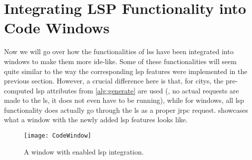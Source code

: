 \documentclass[../thesis]{subfiles}
\begin{document}
\section{Integrating LSP Functionality into Code Windows}\label{sec:intowindow}
Now we will go over how the functionalities of \glspl{ls} have been integrated into \glspl{window} to make them more \gls{ide}-like.
Some of these functionalities will seem quite similar to the way the corresponding  \gls{lsp} features were implemented in the previous section.
However, a crucial difference here is that, for \glspl{city}, the pre-computed \gls{lsp} attributes from \cref{alg:generate} are used (\ie, no actual requests are made to the \gls{ls}, it does not even have to be running), while for \glspl{window}, all \gls{lsp} functionality does actually go through the \gls{ls} as a proper \gls{jrpc} request.
 showcases what a \gls{window} with the newly added \gls{lsp} features looks like.

\begin{figure}
	\begin{center}
		\texttt{[image: CodeWindow]}
	\end{center}
	\caption{A \gls{window} with enabled \gls{lsp} integration.}\label{fig:lspwindow}
\end{figure}
\end{document}
